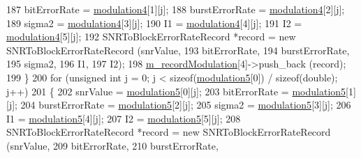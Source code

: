 \begin{DoxyCode}
187       bitErrorRate = \hyperlink{classns3_1_1SNRToBlockErrorRateManager_af9859714760453902c7b79c22ffb2e23}{modulation4}[1][j];
188       burstErrorRate = \hyperlink{classns3_1_1SNRToBlockErrorRateManager_af9859714760453902c7b79c22ffb2e23}{modulation4}[2][j];
189       sigma2 = \hyperlink{classns3_1_1SNRToBlockErrorRateManager_af9859714760453902c7b79c22ffb2e23}{modulation4}[3][j];
190       I1 = \hyperlink{classns3_1_1SNRToBlockErrorRateManager_af9859714760453902c7b79c22ffb2e23}{modulation4}[4][j];
191       I2 = \hyperlink{classns3_1_1SNRToBlockErrorRateManager_af9859714760453902c7b79c22ffb2e23}{modulation4}[5][j];
192       SNRToBlockErrorRateRecord *record = \textcolor{keyword}{new} SNRToBlockErrorRateRecord (snrValue,
193                                                                          bitErrorRate,
194                                                                          burstErrorRate,
195                                                                          sigma2,
196                                                                          I1,
197                                                                          I2);
198       \hyperlink{classns3_1_1SNRToBlockErrorRateManager_af74c812f3b0a25252f2897aadea6898e}{m\_recordModulation}[4]->push\_back (record);
199     \}
200   \textcolor{keywordflow}{for} (\textcolor{keywordtype}{unsigned} \textcolor{keywordtype}{int} j = 0; j < \textcolor{keyword}{sizeof}(\hyperlink{classns3_1_1SNRToBlockErrorRateManager_a372c6f277041e32ca86feef90760a676}{modulation5}[0]) / \textcolor{keyword}{sizeof}(\textcolor{keywordtype}{double}); j++)
201     \{
202       snrValue = \hyperlink{classns3_1_1SNRToBlockErrorRateManager_a372c6f277041e32ca86feef90760a676}{modulation5}[0][j];
203       bitErrorRate = \hyperlink{classns3_1_1SNRToBlockErrorRateManager_a372c6f277041e32ca86feef90760a676}{modulation5}[1][j];
204       burstErrorRate = \hyperlink{classns3_1_1SNRToBlockErrorRateManager_a372c6f277041e32ca86feef90760a676}{modulation5}[2][j];
205       sigma2 = \hyperlink{classns3_1_1SNRToBlockErrorRateManager_a372c6f277041e32ca86feef90760a676}{modulation5}[3][j];
206       I1 = \hyperlink{classns3_1_1SNRToBlockErrorRateManager_a372c6f277041e32ca86feef90760a676}{modulation5}[4][j];
207       I2 = \hyperlink{classns3_1_1SNRToBlockErrorRateManager_a372c6f277041e32ca86feef90760a676}{modulation5}[5][j];
208       SNRToBlockErrorRateRecord *record = \textcolor{keyword}{new} SNRToBlockErrorRateRecord (snrValue,
209                                                                          bitErrorRate,
210                                                                          burstErrorRate,

\end{DoxyCode}
